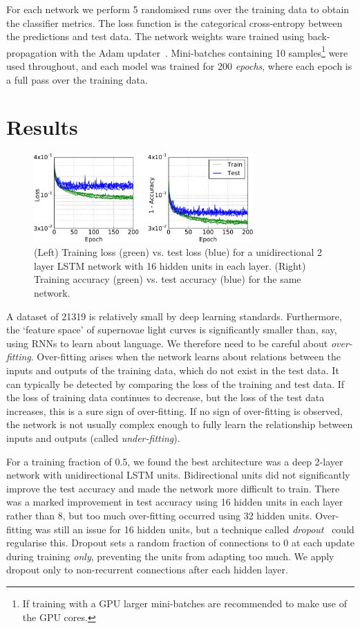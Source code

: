 \documentclass[twocolumn]{aastex61}
\begin{document}
For each network we perform 5 randomised runs over the training data to obtain the classifier metrics. The loss function is the categorical cross-entropy between the predictions and test data. The network weights ware trained using back-propagation with the {\ttfamily Adam} updater~\cite{2014arXiv1412.6980K}. Mini-batches containing 10 samples\footnote{If training with a GPU larger mini-batches are recommended to make use of the GPU cores.} were used throughout, and each model was trained for 200 {\em epochs}, where each epoch is a full pass over the training data.

\section{Results}

\begin{figure}
\centering
\includegraphics[width=84mm, angle=0]{f4.pdf}
\caption{\label{fig:loss} (Left) Training loss (green) vs. test loss (blue) for a unidirectional 2 layer LSTM network with 16 hidden units in each layer. (Right) Training accuracy (green) vs. test accuracy (blue) for the same network.  }
\end{figure}

A dataset of 21319 is relatively small by deep learning standards. Furthermore, the `feature space' of supernovae light curves is significantly smaller than, say, using RNNs to learn about language. We therefore need to be careful about {\em over-fitting}. Over-fitting arises when the network learns about relations between the inputs and outputs of the training data, which do not exist in the test data. It can typically be detected by comparing the loss of the training and test data. If the loss of training data continues to decrease, but the loss of the test data increases, this is a sure sign of over-fitting. If no sign of over-fitting is observed, the network is not usually complex enough to fully learn the relationship between inputs and outputs (called {\em under-fitting}).  

For a training fraction of 0.5, we found the best architecture was a deep 2-layer network with unidirectional LSTM units. Bidirectional units did not significantly improve the test accuracy and made the network more difficult to train. There was a marked improvement in test accuracy using 16 hidden units in each layer rather than 8, but too much over-fitting occurred using 32 hidden units. Over-fitting was still an issue for 16 hidden units,  but a technique called {\em dropout}~\cite{JMLR:v15:srivastava14a} could regularise this. Dropout sets a random fraction of connections to 0 at each update during training {\em only}, preventing the units from adapting too much. We apply dropout only to non-recurrent connections after each hidden layer. 
\end{document}
